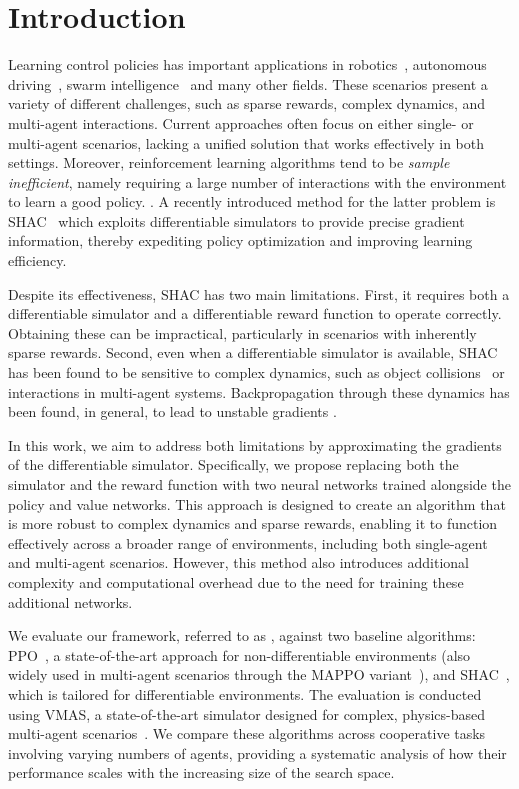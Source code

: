 \section{Introduction}\label{sect:introduction}

Learning control policies has important applications in robotics~\cite{Singh22}, autonomous driving~\cite{Elallid22}, swarm intelligence~\cite{Tang21} and many other fields. These scenarios present a variety of different challenges, such as sparse rewards, complex dynamics, and multi-agent interactions. Current approaches often focus on either single- or multi-agent scenarios, lacking a unified solution that works effectively in both settings. Moreover, reinforcement learning algorithms tend to be \emph{sample inefficient}, namely requiring a large number of interactions with the environment to learn a good policy.
\texttt{\color{DarkOrchid}{<- FB: non mi è super chiara questa frase}}. A recently introduced method for the latter problem is SHAC~\cite{Xu22} which exploits differentiable simulators to provide precise gradient information, thereby expediting policy optimization and improving learning efficiency.

Despite its effectiveness, SHAC has two main limitations. First, it requires both a differentiable simulator and a differentiable reward function to operate correctly. Obtaining these can be impractical, particularly in scenarios with inherently sparse rewards. Second, even when a differentiable simulator is available, SHAC has been found to be sensitive to complex dynamics, such as object collisions~\cite{Georgiev24} or interactions in multi-agent systems. Backpropagation through these dynamics has been found, in general, to lead to unstable gradients \cite{Bengio94,Metz21}.

In this work, we aim to address both limitations by approximating the gradients of the differentiable simulator. Specifically, we propose replacing both the simulator and the reward function with two neural networks trained alongside the policy and value networks. This approach is designed to create an algorithm that is more robust to complex dynamics and sparse rewards, enabling it to function effectively across a broader range of environments, including both single-agent and multi-agent scenarios. However, this method also introduces additional complexity and computational overhead due to the need for training these additional networks.

We evaluate our framework, referred to as \fname{}, against two baseline algorithms: PPO~\cite{Schulman17}, a state-of-the-art approach for non-differentiable environments (also widely used in multi-agent scenarios through the MAPPO variant~\cite{DBLP:conf/nips/YuVVGWBW22}), and SHAC~\cite{Xu22}, which is tailored for differentiable environments. The evaluation is conducted using VMAS, a state-of-the-art simulator designed for complex, physics-based multi-agent scenarios~\cite{DBLP:conf/dars/BettiniKBP22}. We compare these algorithms across cooperative tasks involving varying numbers of agents, providing a systematic analysis of how their performance scales with the increasing size of the search space.

